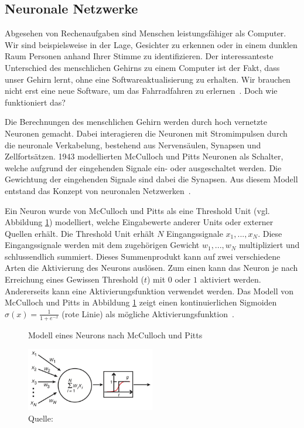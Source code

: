 \subsection{Neuronale Netzwerke}
\label{chap:neuron}

Abgesehen von Rechenaufgaben sind Menschen leistungsfähiger als Computer. Wir sind beispielsweise in der Lage, Gesichter zu erkennen oder in einem dunklen Raum Personen anhand Ihrer Stimme zu identifizieren. Der interessanteste Unterschied des menschlichen Gehirns zu einem Computer ist der Fakt, dass unser Gehirn lernt, ohne eine Softwareaktualisierung zu erhalten. Wir brauchen nicht erst eine neue Software, um das Fahrradfahren zu erlernen~\autocite{Krogh2008}. Doch wie funktioniert das?

Die Berechnungen des menschlichen Gehirn werden durch hoch vernetzte Neuronen gemacht. Dabei interagieren die Neuronen mit Stromimpulsen durch die neuronale Verkabelung, bestehend aus Nervensäulen, Synapsen und Zellfortsätzen. 1943 modellierten McCulloch und Pitts Neuronen als Schalter, welche aufgrund der eingehenden Signale ein- oder ausgeschaltet werden. Die Gewichtung der eingehenden Signale sind dabei die Synapsen. Aus diesem Modell entstand das Konzept von neuronalen Netzwerken~\autocite{Krogh2008}.

Ein Neuron wurde von McCulloch und Pitts als eine Threshold Unit (vgl. Abbildung \ref{krogh:a}) modelliert, welche Eingabewerte anderer Units oder externer Quellen erhält. Die Threshold Unit erhält $N$ Eingangssignale $x_1, ..., x_N$. Diese Eingangssignale werden mit dem zugehörigen Gewicht $w_1, ..., w_N$ multipliziert und schlussendlich summiert. Dieses Summenprodukt kann auf zwei verschiedene Arten die Aktivierung des Neurons auslösen. Zum einen kann das Neuron je nach Erreichung eines Gewissen Threshold ($t$) mit $0$ oder $1$ aktiviert werden. Andererseits kann eine Aktivierungsfunktion verwendet werden. Das Modell von McCulloch und Pitts in Abbildung \ref{krogh:a} zeigt einen kontinuierlichen Sigmoiden $\sigma(x) = \frac{1}{1+e^{-x}}$ (rote Linie) als mögliche Aktivierungsfunktion~\autocite{Krogh2008}. 

\begin{figure}[h!]
    \captionsetup{width=.9\linewidth}
    \caption{Modell eines Neurons nach McCulloch und Pitts}
    \label{krogh:a}
    \centering
    \includegraphics[width=0.5\textwidth]{graphics/krogh/krogh_neural-network.png}
    \vspace*{0.3cm}
    \caption*{Quelle: \textcite{Krogh2008}}
\end{figure}

